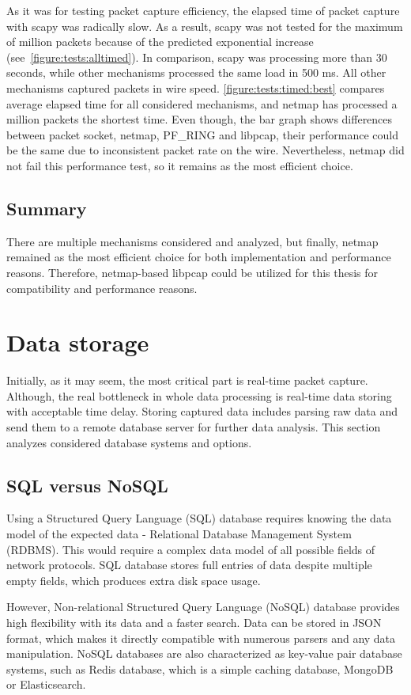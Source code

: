 \documentclass[12pt,a4paper,twoside]{book}
\begin{document}
                As it was for testing packet capture efficiency, the elapsed time of packet capture with scapy was radically slow. As a result, scapy was not tested for the maximum of million packets because of the predicted exponential increase (see~\autoref{figure:tests:alltimed}). In comparison, scapy was processing more than 30 seconds, while other mechanisms processed the same load in 500 ms. All other mechanisms captured packets in wire speed. \autoref{figure:tests:timed:best} compares average elapsed time for all considered mechanisms, and netmap has processed a million packets the shortest time. Even though, the bar graph shows differences between packet socket, netmap, PF\_RING and libpcap, their performance could be the same due to inconsistent packet rate on the wire. Nevertheless, netmap did not fail this performance test, so it remains as the most efficient choice.
                
        \subsection{Summary} \label{analysis:mechs:final}
            There are multiple mechanisms considered and analyzed, but finally, netmap remained as the most efficient choice for both implementation and performance reasons. Therefore, netmap-based libpcap could be utilized for this thesis for compatibility and performance reasons.
    \section{Data storage} \label{analysis:storage}
        Initially, as it may seem, the most critical part is real-time packet capture. Although, the real bottleneck in whole data processing is real-time data storing with acceptable time delay. Storing captured data includes parsing raw data and send them to a remote database server for further data analysis. This section analyzes considered database systems and options.
        \subsection{SQL versus NoSQL} \label{analysis:storage:sql}
            Using a Structured Query Language (SQL) database requires knowing the data model of the expected data - Relational Database Management System (RDBMS). This would require a complex data model of all possible fields of network protocols. SQL database stores full entries of data despite multiple empty fields, which produces extra disk space usage.\par
            However, Non-relational Structured Query Language (NoSQL) database provides high flexibility with its data and a faster search. Data can be stored in JSON format, which makes it directly compatible with numerous parsers and any data manipulation. NoSQL databases are also characterized as key-value pair database systems, such as Redis database, which is a simple caching database, MongoDB or Elasticsearch.
\end{document}

